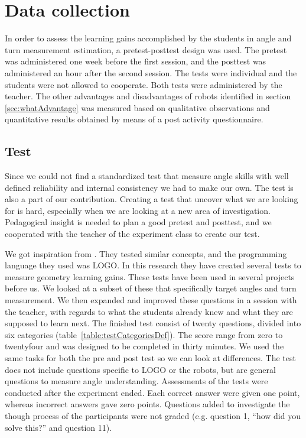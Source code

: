 \section{Data collection}
In order to assess the learning gains accomplished by the students in angle and turn measurement estimation, a pretest-posttest design was used. The pretest was administered one week before the first session, and the posttest was administered an hour after the second session. The tests were individual and the students were not allowed to cooperate. Both tests were administered by the teacher. The other advantages and disadvantages of robots identified in section \ref{sec:whatAdvantage} was measured based on qualitative observations and quantitative results obtained by means of a post activity questionnaire.

\subsection{Test}
Since we could not find a standardized test that measure angle skills with well defined reliability and internal consistency we had to make our own. The test is also a part of our contribution. Creating a test that uncover what we are looking for is hard, especially when we are looking at a new area of investigation. Pedagogical insight is needed to plan a good pretest and posttest, and we cooperated with the teacher of the experiment class to create our test.

\bigskip\noindent
We got inspiration from \citeauthor{clements2001logo}\cite{clements2001logo}. They tested similar concepts, and the programming language they used was LOGO. In this research they have created several tests to measure geometry learning gains. These tests have been used in several projects before us. We looked at a subset of these that specifically target angles and turn measurement. We then expanded and improved these questions in a session with the teacher, with regards to what the students already knew and what they are supposed to learn next. 
The finished test consist of twenty questions, divided into six categories (table~\ref{table:testCategoriesDef}). The score range from zero to twentyfour and was designed to be completed in thirty minutes. We used the same tasks for both the pre and post test so we can look at differences. The test does not include questions specific to LOGO or the robots, but are general questions to measure angle understanding. 
Assessments of the tests were conducted after the experiment ended. Each correct answer were given one point, whereas incorrect answers gave zero points. Questions added to investigate the though process of the participants were not graded (e.g. question 1, "`how did you solve this?"' and question 11). 

